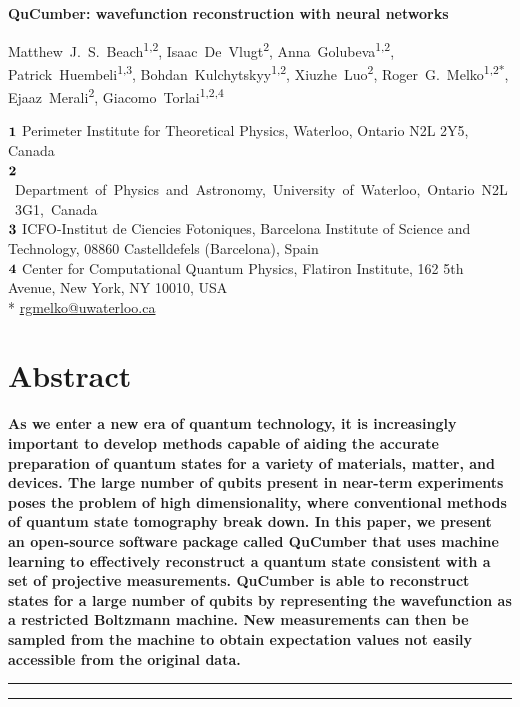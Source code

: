 \documentclass[submission, Phys, hidelnks]{SciPost}
\begin{document}
\begin{center}{\Large \textbf{
    QuCumber: wavefunction reconstruction with neural networks
}}\end{center}

\begin{center}
    Matthew~J.~S.~Beach\textsuperscript{1,2},
    Isaac~De~Vlugt\textsuperscript{2},
    Anna~Golubeva\textsuperscript{1,2},
    Patrick~Huembeli\textsuperscript{1,3},
    Bohdan~Kulchytskyy\textsuperscript{1,2},
    Xiuzhe~Luo\textsuperscript{2},
    Roger~G.~Melko\textsuperscript{1,2*},
    Ejaaz~Merali\textsuperscript{2},
    Giacomo~Torlai\textsuperscript{1,2,4}
\end{center}

\begin{center}
    ${\bf 1}$ Perimeter Institute for Theoretical Physics, Waterloo,
    Ontario N2L 2Y5, Canada
    \\
    \mbox{${\bf 2}$ Department of Physics and Astronomy, University of Waterloo,
    Ontario N2L 3G1, Canada}
    \\
    ${\bf 3}$ ICFO-Institut de Ciencies Fotoniques, Barcelona Institute of Science and Technology,
    08860 Castelldefels (Barcelona), Spain
    \\
    ${\bf 4}$ Center for Computational Quantum Physics, Flatiron Institute,
    162 5th Avenue, New York, NY 10010, USA\\

    * \href{mailto:rgmelko@uwaterloo.ca}{rgmelko@uwaterloo.ca}
\end{center}

\section*{Abstract}
{\bf
As we enter a new era of quantum technology, it is increasingly important to
develop methods capable of aiding the accurate preparation of quantum states
for a variety of materials, matter, and devices. The large number of qubits
present in near-term experiments poses the problem of high dimensionality,
where conventional methods of quantum state tomography break down.
In this paper, we present an open-source software package called QuCumber that
uses machine learning to effectively reconstruct a quantum state consistent
with a set of projective measurements. QuCumber is able to reconstruct states
for a large number of qubits by representing the wavefunction as a restricted
Boltzmann machine. New measurements can then be sampled from the machine to
obtain expectation values not easily accessible from the original data.
}
\noindent\rule{\textwidth}{1pt}
\tableofcontents\thispagestyle{fancy}
\noindent\rule{\textwidth}{1pt}
\end{document}
